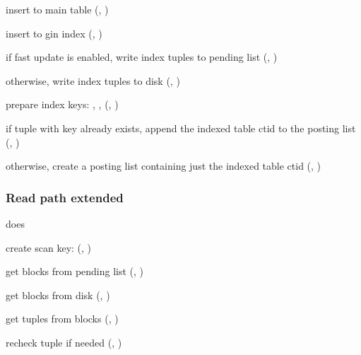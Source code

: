 \documentclass[11pt]{article}
\begin{document}
\begin{nparts}
\item
  insert to main table (, )
\item
  insert to gin index (, )

  \begin{qparts}
  \item
    if fast update is enabled, write index tuples to pending list
    (, )
  \item
    otherwise, write index tuples to disk (,
    )

    \begin{iparts}
    \item
      prepare index keys: , ,
       (,
      )
    \item
      if tuple with key already exists, append the indexed table ctid to the
      posting list (,
      )
    \item
      otherwise, create a posting list containing just the indexed table ctid
      (, )
    \end{iparts}
  \end{qparts}
\end{nparts}

\hypertarget{read-path-extended}{%
\subsubsection{Read path extended}\label{read-path-extended}}

 does

\begin{nparts}
\item
  create scan key:  (,
  )
\item
  get blocks from pending list (,
  )
\item
  get blocks from disk (, )
\item
  get tuples from blocks (,
  )
\item
  recheck tuple if needed (,
  )
\end{nparts}
\end{document}
